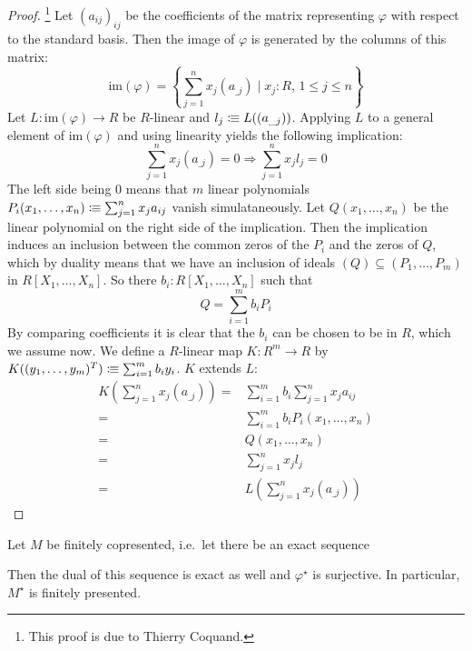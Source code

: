 \begin{proof}\footnote{This proof is due to Thierry Coquand.}
  Let $(a_{ij})_{ij}$ be the coefficients of the matrix representing  $\varphi$ with respect to the standard basis.
  Then the image of $\varphi$ is generated by the columns of this matrix:
  \[
    \mathrm{im}(\varphi)=\left\{\sum_{j=1}^n x_j(a_{\_j})\mid x_j:R\text{, $1\leq j \leq n$}\right\}
  \]
  Let $L:\mathrm{im}(\varphi)\to R$ be $R$-linear and $l_j\vcentcolon\mspace{-1.2mu}\equiv L((a_{\_j}))$.
  Applying $L$ to a general element of $\mathrm{im}(\varphi)$ and using linearity yields the following implication:
  \[
    \sum_{j=1}^n x_j(a_{\_j}) = 0 \Rightarrow \sum_{j=1}^n x_jl_j = 0
  \]
  The left side being 0 means that $m$ linear polynomials $P_i(x_1,\dots,x_n)\vcentcolon\mspace{-1.2mu}\equiv\sum_{j=1}^n x_ja_{ij} $ vanish simulataneously.
  Let $Q(x_1,\dots,x_n)$ be the linear polynomial on the right side of the implication.
  Then the implication induces an inclusion between the common zeros of the $P_i$ and the zeros of $Q$,
  which by duality means that we have an inclusion of ideals $(Q)\subseteq (P_1,\dots,P_m)$ in $R[X_1,\dots,X_n]$.
  So there $b_i:R[X_1,\dots,X_n]$ such that
  \[
     Q = \sum_{i=1}^m b_iP_i
   \]
   By comparing coefficients it is clear that the $b_i$ can be chosen to be in $R$, which we assume now.
   We define a $R$-linear map $K:R^m\to R$ by $K((y_1,\dots,y_m)^T)\vcentcolon\mspace{-1.2mu}\equiv\sum_{i=1}^m b_iy_i$.
   $K$ extends $L$:
   \begin{align*}
     K\left(\sum_{j=1}^n x_j(a_{\_j})\right)=&\sum_{i=1}^m b_i\sum_{j=1}^n x_ja_{ij} \\
     =& \sum_{i=1}^m b_iP_i(x_1,\dots,x_n) \\
     =& Q(x_1,\dots,x_n) \\
     =& \sum_{j=1}^n x_jl_j \\
     =& L\left(\sum_{j=1}^n x_j(a_{\_j})\right)
   \end{align*}
\end{proof}

\begin{lemma}
  \label{dual-of-fcop-fp}
  Let $M$ be finitely copresented, i.e.\ let there be an exact sequence
  \begin{center}
  \end{center}
  Then the dual of this sequence is exact as well and $\varphi^\star$ is surjective.
  In particular, $M^\star$ is finitely presented.
\end{lemma}

